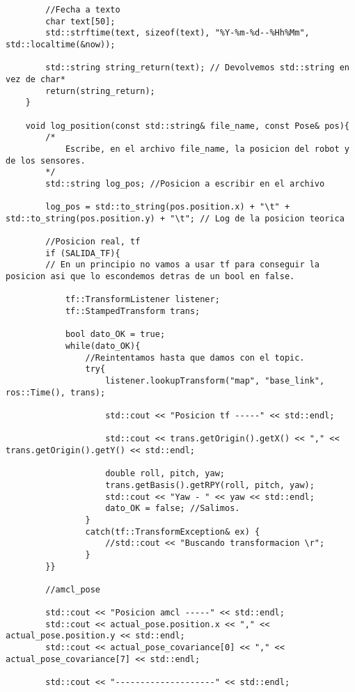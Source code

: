 \begin{lstlisting}
        //Fecha a texto
        char text[50];
        std::strftime(text, sizeof(text), "%Y-%m-%d--%Hh%Mm", std::localtime(&now));
    
        std::string string_return(text); // Devolvemos std::string en vez de char*
        return(string_return);
    }
    
    void log_position(const std::string& file_name, const Pose& pos){
        /* 
            Escribe, en el archivo file_name, la posicion del robot y de los sensores.    
        */
        std::string log_pos; //Posicion a escribir en el archivo
    
        log_pos = std::to_string(pos.position.x) + "\t" + std::to_string(pos.position.y) + "\t"; // Log de la posicion teorica
    
        //Posicion real, tf
        if (SALIDA_TF){
        // En un principio no vamos a usar tf para conseguir la posicion asi que lo escondemos detras de un bool en false.
    
            tf::TransformListener listener;
            tf::StampedTransform trans;  
            
            bool dato_OK = true;
            while(dato_OK){
                //Reintentamos hasta que damos con el topic.
                try{
                    listener.lookupTransform("map", "base_link", ros::Time(), trans);
        
                    std::cout << "Posicion tf -----" << std::endl;
        
                    std::cout << trans.getOrigin().getX() << "," << trans.getOrigin().getY() << std::endl;
                    
                    double roll, pitch, yaw;
                    trans.getBasis().getRPY(roll, pitch, yaw);
                    std::cout << "Yaw - " << yaw << std::endl;
                    dato_OK = false; //Salimos.
                }
                catch(tf::TransformException& ex) {
                    //std::cout << "Buscando transformacion \r";
                }
        }}
    
        //amcl_pose
    
        std::cout << "Posicion amcl -----" << std::endl;
        std::cout << actual_pose.position.x << "," << actual_pose.position.y << std::endl;
        std::cout << actual_pose_covariance[0] << "," << actual_pose_covariance[7] << std::endl;
    
        std::cout << "--------------------" << std::endl;
    

\end{lstlisting}

